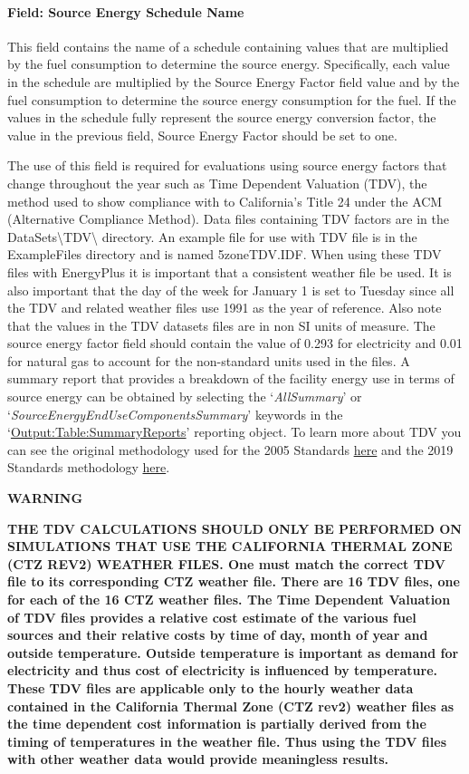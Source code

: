 \paragraph{Field: Source Energy Schedule Name}\label{field-source-energy-schedule-name}

This field contains the name of a schedule containing values that are multiplied by the fuel consumption to determine the source energy. Specifically, each value in the schedule are multiplied by the Source Energy Factor field value and by the fuel consumption to determine the source energy consumption for the fuel. If the values in the schedule fully represent the source energy conversion factor, the value in the previous field, Source Energy Factor should be set to one.

The use of this field is required for evaluations using source energy factors that change throughout the year such as Time Dependent Valuation (TDV), the method used to show compliance with to California's Title 24 under the ACM (Alternative Compliance Method). Data files containing TDV factors are in the DataSets\textbackslash{}TDV\textbackslash{} directory. An example file for use with TDV file is in the ExampleFiles directory and is named 5zoneTDV.IDF. When using these TDV files with EnergyPlus it is important that a consistent weather file be used. It is also important that the day of the week for January 1 is set to Tuesday since all the TDV and related weather files use 1991 as the year of reference. Also note that the values in the TDV datasets files are in non SI units of measure. The source energy factor field should contain the value of 0.293 for electricity and 0.01 for natural gas to account for the non-standard units used in the files. A summary report that provides a breakdown of the facility energy use in terms of source energy can be obtained by selecting the `\emph{AllSummary}' or `\emph{SourceEnergyEndUseComponentsSummary}' keywords in the `\hyperref[outputtablesummaryreports]{Output:Table:SummaryReports}' reporting object. To learn more about TDV you can see the original methodology used for the 2005 Standards \href{http://h-m-g.com/TDV/}{here} and the 2019 Standards methodology \href{https://www.ethree.com/wp-content/uploads/2017/01/TN212524_20160801T120224_2019_TDV_Methodology_Report_7222016.pdf}{here}.

\textbf{WARNING}

\textbf{THE TDV CALCULATIONS SHOULD ONLY BE PERFORMED ON SIMULATIONS THAT USE THE CALIFORNIA THERMAL ZONE (CTZ REV2) WEATHER FILES. One must match the correct TDV file to its corresponding CTZ weather file. There are 16 TDV files, one for each of the 16 CTZ weather files. The Time Dependent Valuation of TDV files provides a relative cost estimate of the various fuel sources and their relative costs by time of day, month of year and outside temperature. Outside temperature is important as demand for electricity and thus cost of electricity is influenced by temperature. These TDV files are applicable only to the hourly weather data contained in the California Thermal Zone (CTZ rev2) weather files as the time dependent cost information is partially derived from the timing of temperatures in the weather file. Thus using the TDV files with other weather data would provide meaningless results.}

